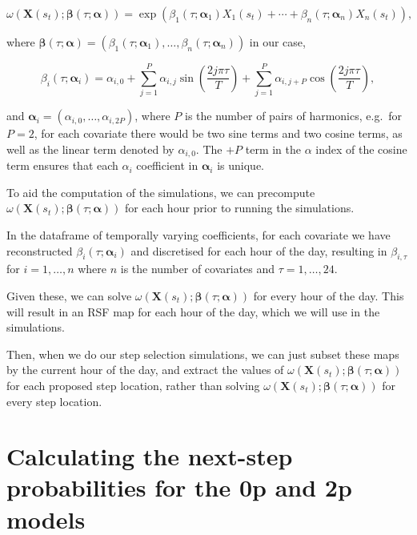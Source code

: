 \documentclass[
  letterpaper,
  DIV=11,
  numbers=noendperiod]{scrartcl}
\begin{document}
\[
    \omega(\mathbf{X}(s_t); \boldsymbol{\beta}(\tau; \boldsymbol{\alpha})) = \exp(\beta_{1}(\tau; \boldsymbol{\alpha}_1) X_1(s_t) + \cdots + \beta_{n}(\tau; \boldsymbol{\alpha}_n) X_n(s_t)),
\]

where
\(\boldsymbol{\beta}(\tau; \boldsymbol{\alpha}) = (\beta_{1}(\tau; \boldsymbol{\alpha}_1), \ldots, \beta_{n}(\tau; \boldsymbol{\alpha}_n))\)
in our case,

\[
\beta_i(\tau; \boldsymbol{\alpha}_i) = \alpha_{i,0} + \sum_{j = 1}^P \alpha_{i,j} \sin \left(\frac{2j \pi \tau}{T} \right) + \sum_{j = 1}^P \alpha_{i,j + P} \cos \left(\frac{2j \pi \tau}{T} \right),
\]

and \(\boldsymbol{\alpha}_i = (\alpha_{i, 0}, \dots, \alpha_{i, 2P})\),
where \(P\) is the number of pairs of harmonics, e.g.~for \(P = 2\), for
each covariate there would be two sine terms and two cosine terms, as
well as the linear term denoted by \(\alpha_{i, 0}\). The \(+ P\) term
in the \(\alpha\) index of the cosine term ensures that each
\(\alpha_i\) coefficient in \(\boldsymbol{\alpha}_i\) is unique.

To aid the computation of the simulations, we can precompute
\(\omega(\mathbf{X}(s_t); \boldsymbol{\beta}(\tau; \boldsymbol{\alpha}))\)
for each hour prior to running the simulations.

In the dataframe of temporally varying coefficients, for each covariate
we have reconstructed \(\beta_{i}(\tau; \boldsymbol{\alpha}_i)\) and
discretised for each hour of the day, resulting in \(\beta_{i,\tau}\)
for \(i = 1, \ldots, n\) where \(n\) is the number of covariates and
\(\tau = 1, \ldots, 24\).

Given these, we can solve
\(\omega(\mathbf{X}(s_t); \boldsymbol{\beta}(\tau; \boldsymbol{\alpha}))\)
for every hour of the day. This will result in an RSF map for each hour
of the day, which we will use in the simulations.

Then, when we do our step selection simulations, we can just subset
these maps by the current hour of the day, and extract the values of
\(\omega(\mathbf{X}(s_t); \boldsymbol{\beta}(\tau; \boldsymbol{\alpha}))\)
for each proposed step location, rather than solving
\(\omega(\mathbf{X}(s_t); \boldsymbol{\beta}(\tau; \boldsymbol{\alpha}))\)
for every step location.

\section{Calculating the next-step probabilities for the 0p and 2p
models}\label{calculating-the-next-step-probabilities-for-the-0p-and-2p-models}
\end{document}
